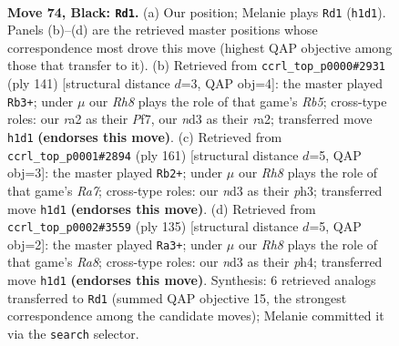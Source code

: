 \documentclass[11pt]{article}
\begin{document}
\clearpage

\begin{figure}[p]\centering
\begin{subfigure}{0.46\textwidth}\centering
\resizebox{\linewidth}{!}{%
\newchessgame
\chessboard[
  setfen={8/8/1k6/8/8/3N2K1/R5P1/7r b - - 13 74},
  showmover=false,
  pgfstyle=straightmove, color=movearrow, markmove={h1-d1}
]}
\caption{}
\end{subfigure}\hfill
\begin{subfigure}{0.46\textwidth}\centering
\resizebox{\linewidth}{!}{%
\newchessgame
\chessboard[
  setfen={8/5p2/8/6k1/1r6/6K1/R5P1/8 b - - 0 71},
  showmover=false,
  pgfstyle=straightmove, color=movearrow, markmove={b4-b3}
]}
\caption{}
\end{subfigure}
\\[4pt]
\begin{subfigure}{0.46\textwidth}\centering
\resizebox{\linewidth}{!}{%
\newchessgame
\chessboard[
  setfen={1R6/1P4k1/1K6/8/8/7P/r7/8 b - - 8 81},
  showmover=false,
  pgfstyle=straightmove, color=movearrow, markmove={a2-b2}
]}
\caption{}
\end{subfigure}\hfill
\begin{subfigure}{0.46\textwidth}\centering
\resizebox{\linewidth}{!}{%
\newchessgame
\chessboard[
  setfen={7R/8/6k1/8/7P/5K2/5P2/r7 b - - 12 68},
  showmover=false,
  pgfstyle=straightmove, color=movearrow, markmove={a1-a3}
]}
\caption{}
\end{subfigure}
\caption{\textbf{Move 74, Black: \texttt{Rd1}.} (a) Our position; Melanie plays \texttt{Rd1} (\texttt{h1d1}). Panels (b)--(d) are the retrieved master positions whose correspondence most drove this move (highest QAP objective among those that transfer to it). (b) Retrieved from \texttt{ccrl\_top\_p0000\#2931} (ply 141) [structural distance $d$=3, QAP obj=4]: the master played \texttt{Rb3+}; under $\mu$ our \emph{Rh8} plays the role of that game's \emph{Rb5}; cross-type roles: our \emph{r}a2 as their \emph{P}f7, our \emph{n}d3 as their \emph{r}a2; transferred move \texttt{h1d1} \textbf{(endorses this move)}. (c) Retrieved from \texttt{ccrl\_top\_p0001\#2894} (ply 161) [structural distance $d$=5, QAP obj=3]: the master played \texttt{Rb2+}; under $\mu$ our \emph{Rh8} plays the role of that game's \emph{Ra7}; cross-type roles: our \emph{n}d3 as their \emph{p}h3; transferred move \texttt{h1d1} \textbf{(endorses this move)}. (d) Retrieved from \texttt{ccrl\_top\_p0002\#3559} (ply 135) [structural distance $d$=5, QAP obj=2]: the master played \texttt{Ra3+}; under $\mu$ our \emph{Rh8} plays the role of that game's \emph{Ra8}; cross-type roles: our \emph{n}d3 as their \emph{p}h4; transferred move \texttt{h1d1} \textbf{(endorses this move)}. Synthesis: 6 retrieved analogs transferred to \texttt{Rd1} (summed QAP objective 15, the strongest correspondence among the candidate moves); Melanie committed it via the \texttt{search} selector.}
\label{fig:thought-m147}
\end{figure}
\end{document}
